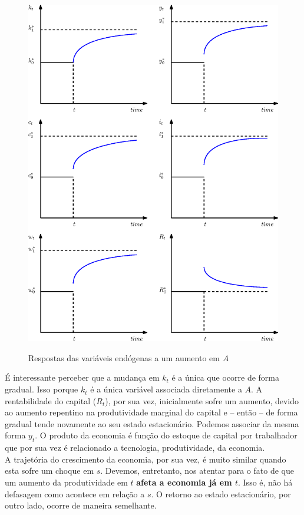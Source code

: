 \documentclass[11pt,a4paper]{article}
\begin{document}
\begin{figure}[!h]
\centering
\caption{Respostas das variáveis endógenas a um aumento em $A$} \vspace{2ex}
\includegraphics[scale=.72]{solow07.eps}
\label{fig:aumento2a}
\end{figure} 

É interessante perceber que a mudança em $k_t$ é a única que ocorre de forma gradual. Isso porque $k_t$ é a única variável associada diretamente a $A$. A rentabilidade do capital ($R_t$), por sua vez, inicialmente sofre um aumento, devido ao aumento repentino na produtividade marginal do capital e -- então -- de forma gradual tende novamente ao seu estado estacionário. Podemos associar da mesma forma $y_t$. O produto da economia é função do estoque de capital por trabalhador que por sua vez é relacionado a tecnologia, produtividade, da economia.\\

A trajetória do crescimento da economia, por sua vez, é muito similar quando esta sofre um choque em $s$. Devemos, entretanto, nos atentar para o fato de que um aumento da produtividade em $t$ \textbf{afeta a economia já em $t$}. Isso é, não há defasagem como acontece em relação a $s$. O retorno ao estado estacionário, por outro lado, ocorre de maneira semelhante. 
\end{document}
